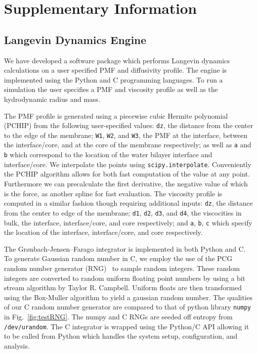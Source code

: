 
\section{Supplementary Information}
    \subsection{Langevin Dynamics Engine}
        \par We have developed a software package which performs Langevin dynamics calculations on a user specified PMF and diffusivity profile. The engine is implemented using the Python and C programming languages. To run a simulation the user specifies a PMF and viscosity profile as well as the hydrodynamic radius and mass.

        \par The PMF profile is generated using a piecewise cubic Hermite polynomial (PCHIP) from the following user-specified values: \texttt{dz}, the distance from the center to the edge of the membrane; \texttt{W1}, \texttt{W2}, and \texttt{W3}, the PMF at the interface, between the interface/core, and at the core of the membrane respectively; as well as \texttt{a} and \texttt{b} which correspond to the location of the water bilayer interface and interface/core.  We interpolate the points using \texttt{scipy.interpolate}. Conveniently the PCHIP algorithm allows for both fast computation of the value at any point. Furthermore we can precalculate the first derivative, the negative value of which is the force, as another spline for fast evaluation. The viscosity profile is computed in a similar fashion though requiring additional inputs: \texttt{dz}, the distance from the center to edge of the membrane; \texttt{d1}, \texttt{d2}, \texttt{d3}, and \texttt{d4}, the viscocities in bulk, the interface, interface/core, and core respectively; and \texttt{a}, \texttt{b}, \texttt{c} which specify the location of the interface, interface/core, and core respectively.

        \par The Gr\o nbach-Jensen--Farago integrator is implemented in both Python and C. To generate Gaussian random number in C, we employ the use of the PCG random number generator (RNG)~\cite{ONeill} to sample random integers. These random integers are converted to random uniform floating point numbers by using a bit stream algorithm by Taylor R. Campbell. Uniform floats are then transformed using the Box-Muller algorithm to yield a gaussian random number. The qualities of our C random number generator are compared to that of python library \texttt{numpy} in Fig.~\ref{fig:testRNG}. The numpy and C RNGs are seeded off entropy from \texttt{/dev/urandom}. The C integrator is wrapped using the Python/C API allowing it to be called from Python which handles the system setup, configuration, and analysis.

